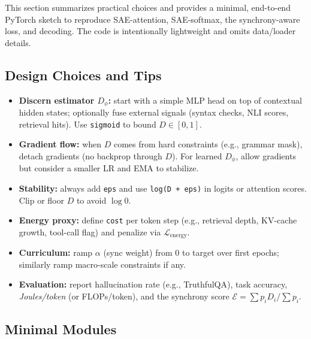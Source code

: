 \documentclass[11pt]{article}
\theoremstyle{plain}
\theoremstyle{definition}
\theoremstyle{remark}
\begin{document}
This section summarizes practical choices and provides a minimal, end-to-end PyTorch sketch to reproduce SAE-attention, SAE-softmax, the synchrony-aware loss, and decoding. The code is intentionally lightweight and omits data/loader details.

\subsection{Design Choices and Tips}
\begin{itemize}
  \item \textbf{Discern estimator $D_\phi$:} start with a simple MLP head on top of contextual hidden states; optionally fuse external signals (syntax checks, NLI scores, retrieval hits). Use \texttt{sigmoid} to bound $D\in[0,1]$.
  \item \textbf{Gradient flow:} when $D$ comes from hard constraints (e.g., grammar mask), detach gradients (no backprop through $D$). For learned $D_\phi$, allow gradients but consider a smaller LR and EMA to stabilize.
  \item \textbf{Stability:} always add \texttt{eps} and use \texttt{log(D + eps)} in logits or attention scores. Clip or floor $D$ to avoid $\log 0$.
  \item \textbf{Energy proxy:} define \texttt{cost} per token step (e.g., retrieval depth, KV-cache growth, tool-call flag) and penalize via $\mathcal{L}_{\text{energy}}$.
  \item \textbf{Curriculum:} ramp \(\alpha\) (sync weight) from 0 to target over first epochs; similarly ramp macro-scale constraints if any.
  \item \textbf{Evaluation:} report hallucination rate (e.g., TruthfulQA), task accuracy, \emph{Joules/token} (or FLOPs/token), and the synchrony score \(\mathcal{E}=\sum p_i D_i / \sum p_i\).
\end{itemize}

\subsection{Minimal Modules}
\end{document}
